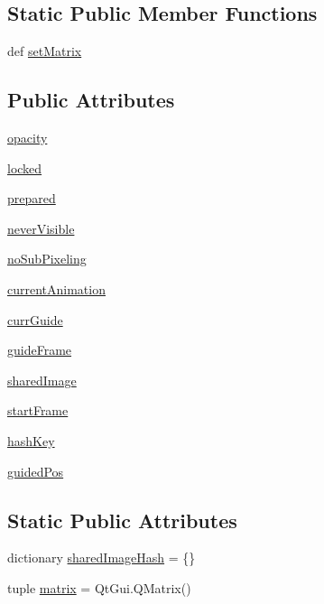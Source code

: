 \subsection*{Static Public Member Functions}
\begin{DoxyCompactItemize}
\item 
def \hyperlink{classdemoitem_1_1DemoItem_acbfda9b1408a16a9d3c8a36f9c9f1eca}{set\+Matrix}
\end{DoxyCompactItemize}
\subsection*{Public Attributes}
\begin{DoxyCompactItemize}
\item 
\hyperlink{classdemoitem_1_1DemoItem_a410824e0d8ee626460021d11dd4f8c27}{opacity}
\item 
\hyperlink{classdemoitem_1_1DemoItem_ad748be79e852d8d6159f0d12a5d93237}{locked}
\item 
\hyperlink{classdemoitem_1_1DemoItem_a1a8a0acf5e3eaf68a2f9efef0fe21bd1}{prepared}
\item 
\hyperlink{classdemoitem_1_1DemoItem_a7bc6b4fdddf8592a8e798d091332b4c4}{never\+Visible}
\item 
\hyperlink{classdemoitem_1_1DemoItem_a6417c7339ca96839b60411b623a6202b}{no\+Sub\+Pixeling}
\item 
\hyperlink{classdemoitem_1_1DemoItem_a889f21f1202ba69277a978c0fd2cab7d}{current\+Animation}
\item 
\hyperlink{classdemoitem_1_1DemoItem_a0d789ab4de01d377befed495633cb4e2}{curr\+Guide}
\item 
\hyperlink{classdemoitem_1_1DemoItem_a852d2d99178bd3f2edb418f403097766}{guide\+Frame}
\item 
\hyperlink{classdemoitem_1_1DemoItem_aaf54c5f33bc448d31f7520dc204f53b2}{shared\+Image}
\item 
\hyperlink{classdemoitem_1_1DemoItem_a4f1b15adcd4465c7d29ae0b9f322e100}{start\+Frame}
\item 
\hyperlink{classdemoitem_1_1DemoItem_adcc75d185e9ed1ced07a3ff4f0e6449f}{hash\+Key}
\item 
\hyperlink{classdemoitem_1_1DemoItem_aea40445d8520ce6fea97b9fa8a32cd85}{guided\+Pos}
\end{DoxyCompactItemize}
\subsection*{Static Public Attributes}
\begin{DoxyCompactItemize}
\item 
dictionary \hyperlink{classdemoitem_1_1DemoItem_a584fa91a610799d2aa3856fec02e293d}{shared\+Image\+Hash} = \{\}
\item 
tuple \hyperlink{classdemoitem_1_1DemoItem_ac3d7a5dc854e09e5b705f65a24b611e2}{matrix} = Qt\+Gui.\+Q\+Matrix()
\end{DoxyCompactItemize}


